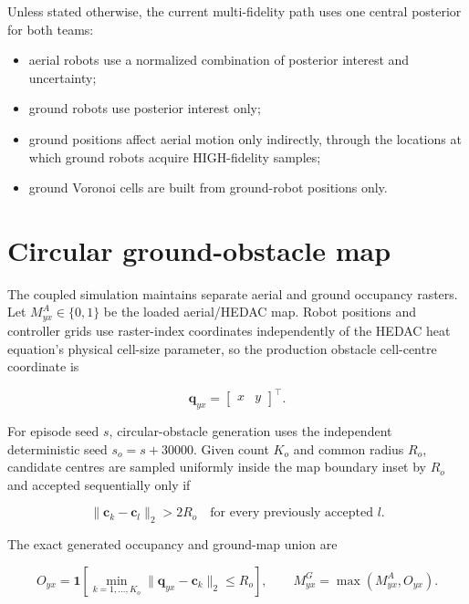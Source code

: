 \documentclass[11pt]{article}
\begin{document}
Unless stated otherwise, the current multi-fidelity path uses one central posterior for both teams:


\begin{itemize}
\item aerial robots use a normalized combination of posterior interest and uncertainty;
\item ground robots use posterior interest only;
\item ground positions affect aerial motion only indirectly, through the locations at which ground robots acquire HIGH-fidelity samples;
\item ground Voronoi cells are built from ground-robot positions only.
\end{itemize}


\section{Circular ground-obstacle map}


The coupled simulation maintains separate aerial and ground occupancy rasters. Let $M^A_{yx}\in\{0,1\}$ be the loaded aerial/HEDAC map. Robot positions and controller grids use raster-index coordinates independently of the HEDAC heat equation's physical cell-size parameter, so the production obstacle cell-centre coordinate is


\begin{equation}
\mathbf q_{yx}=
\begin{bmatrix}x&y\end{bmatrix}^{\!\top}.
\end{equation}


For episode seed $s$, circular-obstacle generation uses the independent deterministic seed $s_o=s+30000$. Given count $K_o$ and common radius $R_o$, candidate centres are sampled uniformly inside the map boundary inset by $R_o$ and accepted sequentially only if


\begin{equation}
\lVert\mathbf c_k-\mathbf c_l\rVert_2>2R_o
\quad\text{for every previously accepted }l.
\end{equation}


The exact generated occupancy and ground-map union are


\begin{equation}
O_{yx}
=
\mathbf 1\!\left[
\min_{k=1,\ldots,K_o}
\lVert\mathbf q_{yx}-\mathbf c_k\rVert_2
\le R_o
\right],
\qquad
M^G_{yx}=\max(M^A_{yx},O_{yx}).
\end{equation}
\end{document}
